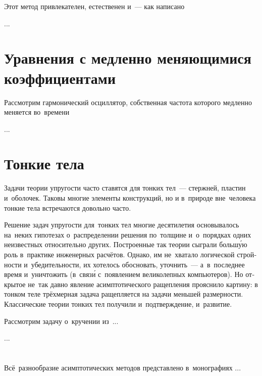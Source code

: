 \begin{otherlanguage}{russian}
Этот метод привлекателен, естественен и~--- как написано

...




\section{Уравнения с медленно меняющимися коэффициентами}

Рассмотрим гармонический осциллятор, собственная частота которого медленно меняется во~времени

...




\section{Тонкие тела}

Задачи теории упругости часто ставятся для тонких тел~--- стержней, пластин и~оболочек. Таковы многие элементы конструкций, но и в~природе вне~человека тонкие тела встречаются довольно часто.

Решение задач упругости для~тонких тел многие десятилетия основывалось на~неких гипотезах о~распределении решения по~толщине и~о~порядках одних неизвестных относительно других. Построенные так теории сыграли больш\'{у}ю роль в~практике инженерных расчётов. Однако, им не~хватало логической стройности и~убедительности, их хотелось обосновать, уточнить~--- а~в~последнее время и~уничтожить (в~связ\'{и} с~появлением великолепных компьютеров). Но открытое не~так давно явление асимптотического ращепления прояснило картину: в тонком теле трёхмерная задача ращепляется на задачи меньшей размерности. Классические теории тонких тел получили и~подтверждение, и~развитие.

Рассмотрим задачу о~кручении из~...

...





\vspace{8mm}
\hfill\begin{minipage}[b]{0.95\linewidth}
\fontsize{10}{12}\selectfont

\section*{\wordforbibliography}

Всё~разнообразие асимптотических методов представлено в~монографиях ...

\end{minipage}

\end{otherlanguage}
